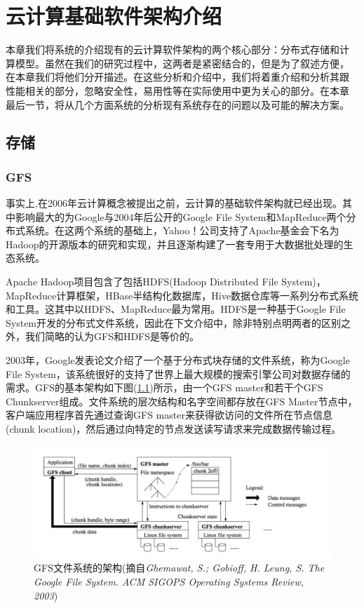 \chapter{云计算基础软件架构介绍}
\label{chapter:techs}
本章我们将系统的介绍现有的云计算软件架构的两个核心部分：分布式存储和计
算模型。虽然在我们的研究过程中，这两者是紧密结合的，但是为了叙述方便，
在本章我们将他们分开描述。在这些分析和介绍中，我们将着重介绍和分析其跟
性能相关的部分，忽略安全性，易用性等在实际使用中更为关心的部分。在本章
最后一节，将从几个方面系统的分析现有系统存在的问题以及可能的解决方案。


\section{存储}
\subsection{GFS}
事实上,在2006年云计算概念被提出之前，云计算的基础软件架构就已经出现。其中影响最大的为Google与2004年后公开的Google File System和MapReduce两个分布式系统。在这两个系统的基础上，Yahoo！公司支持了Apache基金会下名为Hadoop的开源版本的研究和实现，并且逐渐构建了一套专用于大数据批处理的生态系统。

Apache Hadoop项目包含了包括HDFS(Hadoop Distributed File System)，MapReduce计算框架，HBase半结构化数据库，Hive数据仓库等一系列分布式系统和工具。这其中以HDFS、MapReduce最为常用。HDFS是一种基于Google File System开发的分布式文件系统，因此在下文介绍中，除非特别点明两者的区别之外，我们简略的认为GFS和HDFS是等价的。

2003年，Google发表论文介绍了一个基于分布式块存储的文件系统，称为Google File System，该系统很好的支持了世界上最大规模的搜索引擎公司对数据存储的需求。GFS的基本架构如下图(\ref{fig:gfsarch})所示，由一个GFS master和若干个GFS Chunkserver组成。文件系统的层次结构和名字空间都存放在GFS Master节点中，客户端应用程序首先通过查询GFS master来获得欲访问的文件所在节点信息(chunk location)，然后通过向特定的节点发送读写请求来完成数据传输过程。

\begin{figure}[]
\centering
\includegraphics[width=6.5in]{../figures/gfsarch.pdf}
\caption{GFS文件系统的架构(摘自\textit{Ghemawat, S.; Gobioff, H.  Leung, S. The Google File System. ACM SIGOPS Operating Systems Review, 2003})}
\label{fig:gfsarch}
\end{figure}

